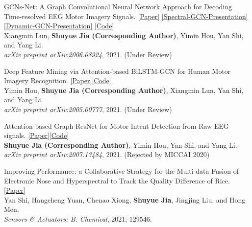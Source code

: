 \documentclass{my_cv}
\begin{document}
\hspace*{\fill} 

\workitemsone
{GCNs-Net: A Graph Convolutional Neural Network Approach for Decoding Time-resolved EEG Motor Imagery Signals. \href{https://arxiv.org/abs/2006.08924}{[Paper]} \href{https://shuyuej.com/files/GCNs-Net.pdf}{[Spectral-GCN-Presentation]} \href{https://shuyuej.com/files/Dynamic-GCN-Survey.pdf}{[Dynamic-GCN-Presentation]} \href{https://github.com/SuperBruceJia/EEG-DL}{[Code]}\\
	Xiangmin Lun, \textbf{Shuyue Jia (Corresponding Author)}, Yimin Hou, Yan Shi, and Yang Li.\\
	\emph{arXiv preprint arXiv:2006.08924}, 2021. (Under Review)}

\hspace*{\fill} 

\workitemsone
{Deep Feature Mining via Attention-based BiLSTM-GCN for Human Motor Imagery Recognition. \href{https://arxiv.org/abs/2005.00777}{[Paper]}\href{https://github.com/SuperBruceJia/EEG-DL}{[Code]}\\
	Yimin Hou, \textbf{Shuyue Jia (Corresponding Author)}, Xiangmin Lun, Yan Shi, and Yang Li.\\
	\emph{arXiv preprint arXiv:2005.00777}, 2021. (Under Review)}

\hspace*{\fill}

\workitemsone
{Attention-based Graph ResNet for Motor Intent Detection from Raw EEG signals. \href{https://arxiv.org/abs/2007.13484}{[Paper]}\href{https://github.com/SuperBruceJia/EEG-DL}{[Code]}\\
	\textbf{Shuyue Jia (Corresponding Author)}, Yimin Hou, Yan Shi, and Yang Li.\\
	\emph{arXiv preprint arXiv:2007.13484}, 2021. (Rejected by MICCAI 2020)}

\hspace*{\fill}

\workitemsone
{Improving Performance: a Collaborative Strategy for the Multi-data Fusion of Electronic Nose and Hyperspectral to Track the Quality Difference of Rice. \href{https://www.sciencedirect.com/science/article/abs/pii/S0925400521001143}{[Paper]} \\
	Yan Shi, Hangcheng Yuan, Chenao Xiong, \textbf{Shuyue Jia}, Jingjing Liu, and Hong Men.\\
	\emph{Sensors \& Actuators: B. Chemical}, 2021; 129546.}

\hspace*{\fill}
\end{document}
